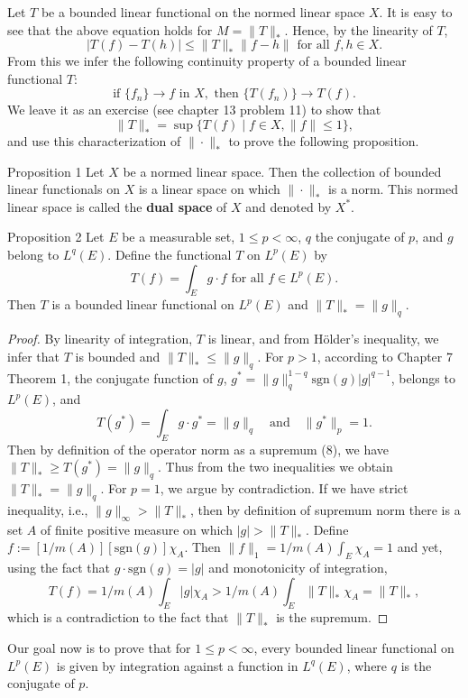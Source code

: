 Let $T$ be a bounded linear functional on the normed linear space $X$.
It is easy to see that the above equation holds for $M=\|T\|_*$.
Hence, by the linearity of $T$,
\[
    |T(f)-T(h)|\le \|T\|_*\|f-h\|\text{ for all }f,h\in X.
\]
From this we infer the following continuity property of a bounded linear functional $T$:
\[
    \text{if }\{f_n\}\to f\text{ in }X,\text{ then }\{T(f_n)\}\to T(f).\tag{7}
\]
We leave it as an exercise (see chapter 13 problem 11) to show that 
\[
    \|T\|_*=\sup\{T(f)\mid f\in X,\|f\|\le1\},\tag{8}
\]
and use this characterization of $\|\cdot\|_*$ to prove the following proposition.
\begin{namedthm*}{Proposition 1}
    Let $X$ be a normed linear space.
    Then the collection of bounded linear functionals on $X$ is a linear space on which $\|\cdot\|_*$ is a norm.
    This normed linear space is called the \textbf{dual space} of $X$ and denoted by $X^*$.
\end{namedthm*}
\begin{namedthm*}{Proposition 2}
    Let $E$ be a measurable set, $1\le p<\infty$, $q$ the conjugate of $p$, and $g$ belong to $L^q(E)$.
    Define the functional $T$ on $L^p(E)$ by
    \[
        T(f)=\int_Eg\cdot f\text{ for all }f\in L^p(E).
    \]
    Then $T$ is a bounded linear functional on $L^p(E)$ and $\|T\|_*=\|g\|_q$.
\end{namedthm*}
\begin{proof}
    By linearity of integration, $T$ is linear, and from H\"older's inequality, we infer that $T$ is bounded and $\|T\|_*\le\|g\|_q$.
    For $p>1$, according to Chapter 7 Theorem 1, the conjugate function of $g$, $g^*=\|g\|_q^{1-q}\text{sgn}(g)|g|^{q-1}$, belongs to $L^p(E)$, and 
    \[
        T(g^*)=\int_Eg\cdot g^*=\|g\|_q\quad\text{and}\quad\|g^*\|_p=1.
    \] 
    Then by definition of the operator norm as a supremum (8), we have $\|T\|_*\ge T(g^*)=\|g\|_q$.
    Thus from the two inequalities we obtain $\|T\|_*=\|g\|_q$.
    For $p=1$, we argue by contradiction.
    If we have strict inequality, i.e., $\|g\|_\infty>\|T\|_*$, then by definition of supremum norm there is a set $A$ of finite positive measure on which $|g|>\|T\|_*$.
    Define $f:=[1/m(A)][\text{sgn}(g)]\chi_A$. 
    Then $\|f\|_1=1/m(A)\int_E\chi_A=1$ and yet, using the fact that $g\cdot\text{sgn}(g)=|g|$ and monotonicity of integration,
    \[
        T(f)=1/m(A)\int_E|g|\chi_A>1/m(A)\int_E\|T\|_*\chi_A=\|T\|_*,
    \]
    which is a contradiction to the fact that $\|T\|_*$ is the supremum.

\end{proof}
Our goal now is to prove that for $1\le p<\infty$, every bounded linear functional on $L^p(E)$ is given by integration against a function in $L^q(E)$, where $q$ is the conjugate of $p$.

